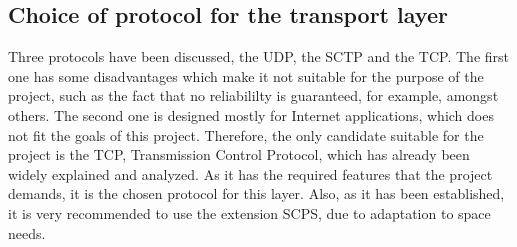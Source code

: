 \subsection{Choice of protocol for the transport layer}
Three protocols have been discussed, the UDP, the SCTP and the TCP. The first one has some disadvantages which make it not suitable for the purpose of the project, such as the fact that no reliabililty is guaranteed, for example, amongst others. The second one is designed mostly for Internet applications, which does not fit the goals of this project. Therefore, the only candidate suitable for the project is the TCP, Transmission Control Protocol, which has already been widely explained and analyzed. As it has the required features that the project demands, it is the chosen protocol for this layer. Also, as it has been established, it is very recommended to use the extension SCPS, due to adaptation to space needs.  